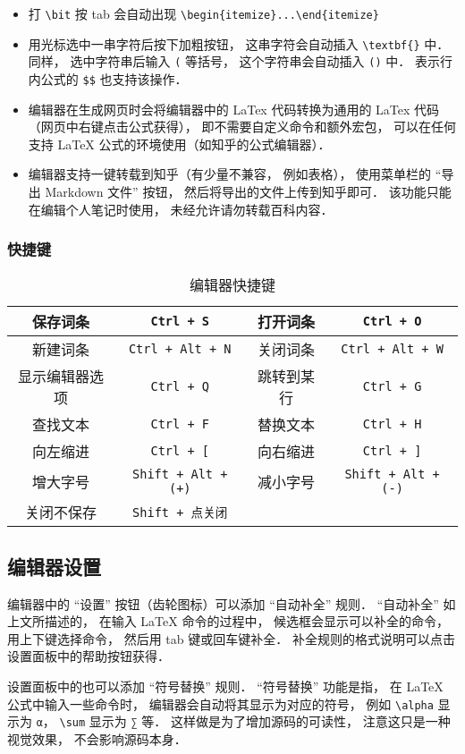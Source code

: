 \begin{itemize}
\item 打 \verb|\bit| 按 tab 会自动出现 \verb|\begin{itemize}...\end{itemize}|
\item 用光标选中一串字符后按下加粗按钮， 这串字符会自动插入 \verb|\textbf{}| 中． 同样， 选中字符串后输入 \verb|(| 等括号， 这个字符串会自动插入 \verb|()| 中． 表示行内公式的 \verb|$$| 也支持该操作．
\item 编辑器在生成网页时会将编辑器中的 LaTex 代码转换为通用的 LaTex 代码（网页中右键点击公式获得）， 即不需要自定义命令和额外宏包， 可以在任何支持 LaTeX 公式的环境使用（如知乎的公式编辑器）．
\item 编辑器支持一键转载到知乎（有少量不兼容， 例如表格）， 使用菜单栏的 “导出 Markdown 文件” 按钮， 然后将导出的文件上传到知乎即可． 该功能只能在编辑个人笔记时使用， 未经允许请勿转载百科内容．
\end{itemize}

\subsubsection{快捷键}

\begin{table}[ht]
\centering
\caption{编辑器快捷键}\label{editor_tab1}
\begin{tabular}{|c|c|c|c|}
\hline
保存词条 & \verb|Ctrl + S| & 打开词条 & \verb|Ctrl + O| \\
\hline
新建词条 & \verb|Ctrl + Alt + N| & 关闭词条 & \verb|Ctrl + Alt + W| \\
\hline
显示编辑器选项 & \verb|Ctrl + Q| & 跳转到某行 & \verb|Ctrl + G| \\
\hline
查找文本 & \verb|Ctrl + F| & 替换文本 & \verb|Ctrl + H| \\
\hline
向左缩进 & \verb|Ctrl + [| & 向右缩进 & \verb|Ctrl + ]| \\
\hline
增大字号 & \verb|Shift + Alt + (+)| & 减小字号 & \verb|Shift + Alt + (-)| \\
\hline
关闭不保存 & \verb|Shift + 点关闭| &  &  \\
\hline
\end{tabular}
\end{table}

\subsection{编辑器设置}
编辑器中的 “设置” 按钮（齿轮图标）可以添加 “自动补全” 规则． “自动补全” 如上文所描述的， 在输入 LaTeX 命令的过程中， 候选框会显示可以补全的命令， 用上下键选择命令， 然后用 tab 键或回车键补全． 补全规则的格式说明可以点击设置面板中的帮助按钮获得．

设置面板中的也可以添加 “符号替换” 规则． “符号替换” 功能是指， 在 LaTeX 公式中输入一些命令时， 编辑器会自动将其显示为对应的符号， 例如 \verb|\alpha| 显示为 \lstinline|α|， \verb|\sum| 显示为 \lstinline|∑| 等． 这样做是为了增加源码的可读性， 注意这只是一种视觉效果， 不会影响源码本身．
